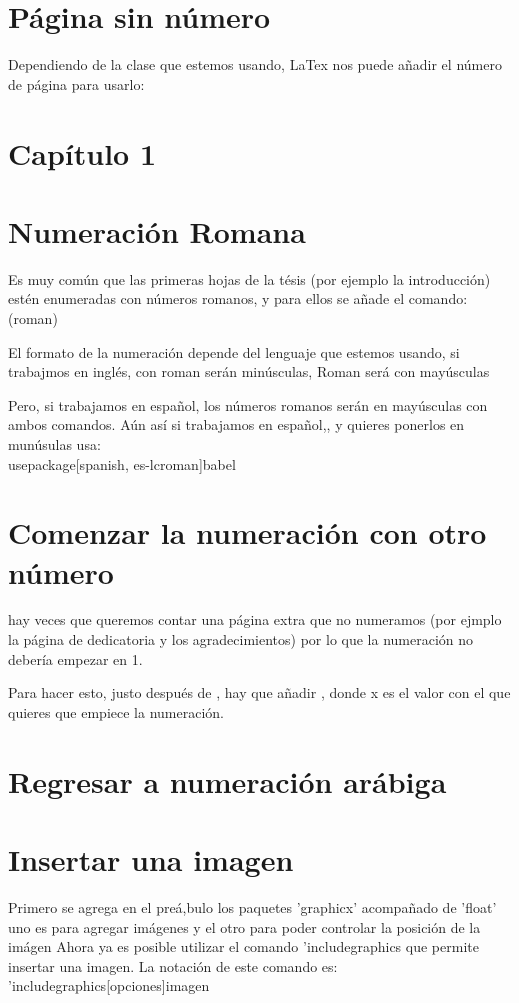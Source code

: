 \documentclass{IEEEtran}
\begin{document}
\clearpage
\section{Página sin número}
Dependiendo de la clase que estemos usando, LaTex nos puede añadir el número de página para usarlo:
\tableofcontents
\thispagestyle{empty}
\clearpage

\section{Capítulo 1}
\label{secuno}

\section{Numeración Romana}
Es muy común que las primeras hojas de la tésis (por ejemplo la introducción) estén enumeradas con números romanos, y para ellos se añade el comando:
\pagenumbering(roman)

El formato de la numeración depende del lenguaje que estemos usando, si trabajmos en inglés, con {roman} serán minúsculas, {Roman} será con mayúsculas

Pero, si trabajamos en español, los números romanos serán en mayúsculas con ambos comandos. Aún así si trabajamos en español,, y quieres ponerlos en munúsulas usa:\\
usepackage[spanish, es-lcroman]{babel}

\section{Comenzar la numeración con otro número}
hay veces que queremos contar una página extra que no numeramos (por ejmplo la página de dedicatoria y los agradecimientos) por lo que la numeración no debería empezar en 1.

Para hacer esto, justo después de \pagenumbering, hay que añadir \setcounter{page}{x}, donde x es el valor con el que quieres que empiece la numeración.

\section{Regresar a numeración arábiga}
\setcounter{page}{1} %

\section{Insertar una imagen}
Primero se agrega en el preá,bulo los paquetes 'graphicx' acompañado de 'float' uno es para agregar imágenes y el otro para poder controlar la posición de la imágen
Ahora ya es posible utilizar el comando 'includegraphics que permite insertar una imagen. La notación de este comando es: 'includegraphics[opciones]{imagen}
\end{document}
